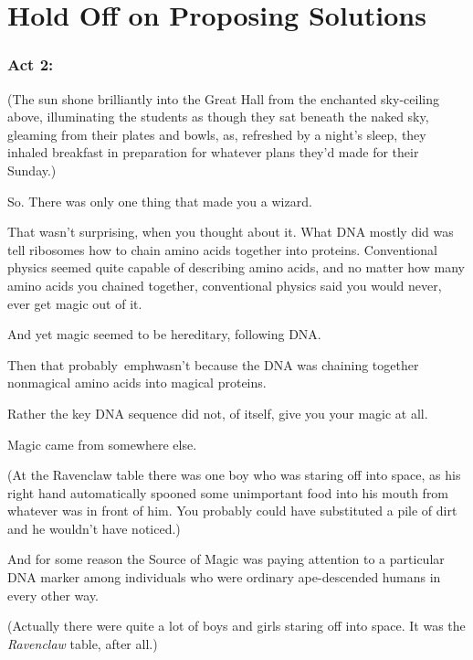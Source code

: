 \chapter{Hold Off on Proposing Solutions}

\subsection{Act 2:}

(The sun shone brilliantly into the Great Hall from the enchanted sky-ceiling 
above, illuminating the students as though they sat beneath the naked sky, 
gleaming from their plates and bowls, as, refreshed by a night's sleep, they 
inhaled breakfast in preparation for whatever plans they'd made for their 
Sunday.)

So. There was only one thing that made you a wizard.

That wasn't surprising, when you thought about it. What DNA mostly did was tell 
ribosomes how to chain amino acids together into proteins. Conventional physics 
seemed quite capable of describing amino acids, and no matter how many amino 
acids you chained together, conventional physics said you would never, ever get 
magic out of it.

And yet magic seemed to be hereditary, following DNA.

Then that probably\ emph{wasn't} because the DNA was chaining together 
nonmagical amino acids into magical proteins.

Rather the key DNA sequence did not, of itself, give you your magic at all.

Magic came from somewhere else.

(At the Ravenclaw table there was one boy who was staring off into space, as 
his right hand automatically spooned some unimportant food into his mouth from 
whatever was in front of him. You probably could have substituted a pile of 
dirt and he wouldn't have noticed.)

And for some reason the Source of Magic was paying attention to a particular 
DNA marker among individuals who were ordinary ape-descended humans in every 
other way.

(Actually there were quite a lot of boys and girls staring off into space. It 
was the \emph{Ravenclaw} table, after all.)


